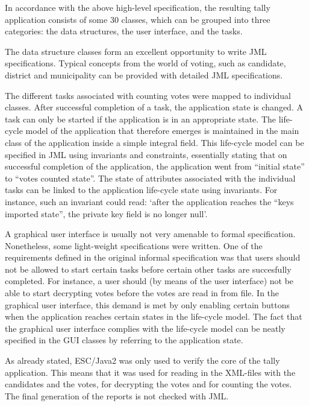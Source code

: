 \documentclass[times, 10pt, twocolumn]{article}
\begin{document}

In accordance with the above high-level specification, the resulting tally 
application consists of some 30 classes, which can be grouped into three 
categories: the data structures, the user interface, and the tasks.

The data structure classes form an excellent opportunity to write JML 
specifications. Typical concepts from the world of voting, such as candidate, 
district and municipality can be provided with detailed JML specifications.

The different tasks associated with counting votes were mapped to individual 
classes. After successful completion of a task, the application state is 
changed. A task can only be started if the application is in an appropriate 
state. The life-cycle model of the application that therefore emerges is 
maintained in the main class of the application inside a simple integral field. 
This life-cycle model can be specified in JML using invariants and constraints, 
essentially stating that on successful completion of the application, the 
application went from ``initial state'' to ``votes counted state''. The state 
of attributes associated with the individual tasks can be linked to the 
application life-cycle state using invariants. For instance, such an invariant 
could read: `after the application reaches the ``keys imported state'', the 
private key field is no longer null'.

A graphical user interface is usually not very amenable to formal 
specification. Nonetheless, some light-weight specifications were written. One 
of the requirements defined in the original informal specification was that 
users should not be allowed to start certain tasks before certain other tasks 
are succesfully completed. For instance, a user should (by means of the user 
interface) not be able to start decrypting votes before the votes are read in 
from file. In the graphical user interface, this demand is met by only enabling 
certain buttons when the application reaches certain states in the life-cycle 
model. The fact that the graphical user interface complies with the life-cycle 
model can be neatly specified in the GUI classes by referring to the 
application state.

As already stated, ESC/Java2 was only used to verify the core of the tally 
application. This means that it was used for reading in the XML-files with the 
candidates and the votes, for decrypting the votes and for counting the votes. 
The final generation of the reports is not checked with JML.
\end{document}
